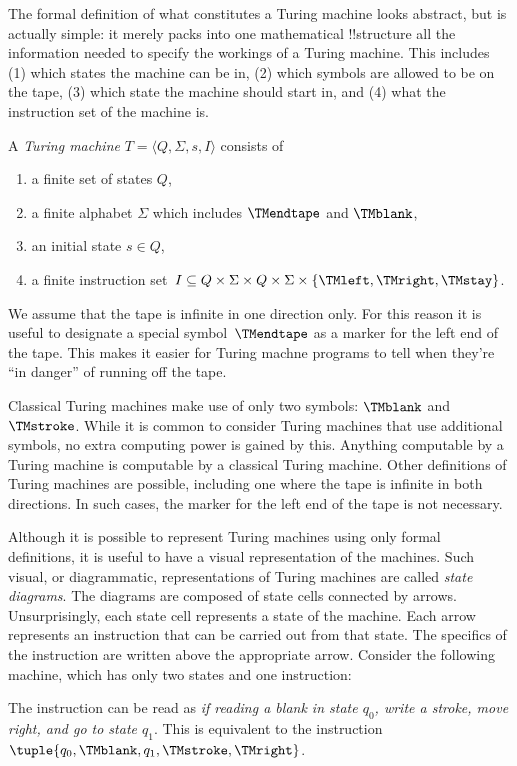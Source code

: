\documentclass[../../include/open-logic-section]{subfiles}
\begin{document}

\begin{explain}
The formal definition of what constitutes a Turing machine looks
abstract, but is actually simple: it merely packs into one
mathematical !!{structure} all the information needed to specify the
workings of a Turing machine. This includes (1) which states the
machine can be in, (2) which symbols are allowed to be on the tape, (3)
which state the machine should start in, and (4) what the instruction
set of the machine is.
\end{explain}

\begin{defn}
A \emph{Turing machine} $T = \langle Q, \Sigma, s, I\rangle$ consists of
\begin{enumerate}
\item a finite set of states $Q$,
\item a finite alphabet $\Sigma$ which includes $\TMendtape$ and
  $\TMblank$,
\item an initial state $s \in Q$,
\item a finite instruction set~$I \subseteq Q \times \Sigma \times Q
  \times \Sigma \times \{\TMleft, \TMright, \TMstay\}$.
\end{enumerate}
\end{defn}

\begin{explain}
We assume that the tape is infinite in one direction only. For this
reason it is useful to designate a special symbol~$\TMendtape$ as
a marker for the left end of the tape. This makes it easier for
Turing machne programs to tell when they're ``in danger'' of running
off the tape. 

Classical Turing machines make use of only two symbols: $\TMblank$ and
$\TMstroke$. While it is common to consider Turing machines that use additional
symbols, no extra computing power is gained by this. Anything computable by
a Turing machine is computable by a classical Turing machine. Other
definitions of Turing machines are possible,
including one where the tape is infinite in both directions. In such cases,
the marker for the left end of the tape is not necessary.
\end{explain}

\begin{ex}
Although it is possible to represent Turing machines using only formal
definitions, it is useful to have a visual representation of the
machines. Such visual, or diagrammatic, representations of Turing
machines are called \emph{state diagrams}. The diagrams are composed of
state cells connected by arrows. Unsurprisingly, each state cell represents
a state of the machine. Each arrow represents an instruction that can be
carried out from that state. The specifics of the instruction are written above
the appropriate arrow. Consider the following machine, which has only two
states and one instruction:


The instruction can be read as \emph{if reading a blank in
state $q_0$, write a stroke, move right, and go to state $q_1$}. This is
equivalent to the instruction $\tuple{q_0, \TMblank, q_1, \TMstroke, 
\TMright}$.
\end{ex}
\end{document}
